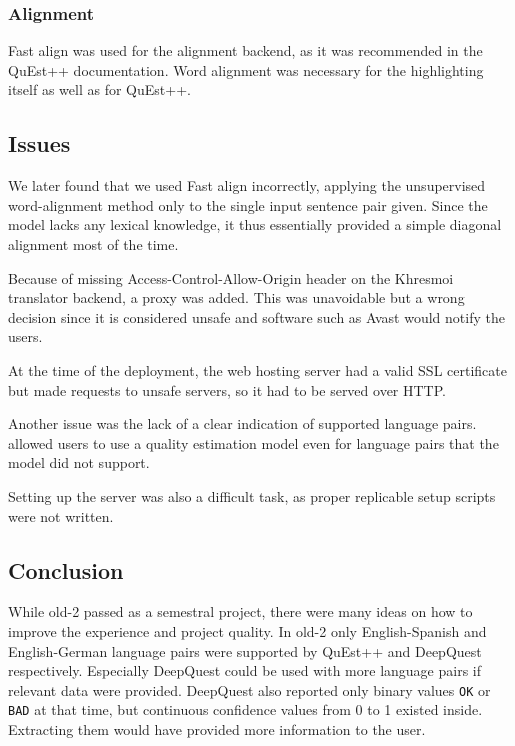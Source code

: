 \subsubsection*{Alignment}

Fast align was used for the alignment backend, as it was recommended in the QuEst++ documentation. Word alignment was necessary for the highlighting itself as well as for QuEst++.

\subsection{Issues}

We later found that we used Fast align incorrectly, applying the unsupervised word-alignment method only to the single input sentence pair given. Since the model lacks any lexical knowledge, it thus essentially provided a simple diagonal alignment most of the time.

Because of missing Access-Control-Allow-Origin header on the Khresmoi translator backend, a proxy was added. This was unavoidable but a wrong decision since it is considered unsafe and software such as Avast would notify the users.

At the time of the deployment, the web hosting server had a valid SSL certificate but made requests to unsafe servers, so it had to be served over HTTP.

Another issue was the lack of a clear indication of supported language pairs. \ptakopet{} allowed users to use a quality estimation model even for language pairs that the model did not support.

Setting up the server was also a difficult task, as proper replicable setup scripts were not written.

\subsection{Conclusion}

While \ptakopet{} old-2 passed as a semestral project, there were many ideas on how to improve the experience and project quality. In \ptakopet{} old-2 only English-Spanish and English-German language pairs were supported by QuEst++ and DeepQuest respectively. Especially DeepQuest could be used with more language pairs if relevant data were provided. DeepQuest also reported only binary values \texttt{OK} or \texttt{BAD} at that time, but continuous confidence values from 0 to 1 existed inside. Extracting them would have provided more information to the user.

